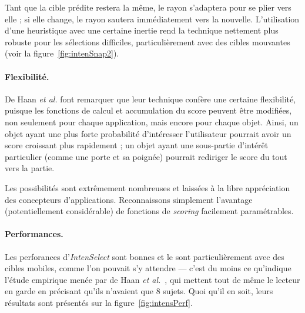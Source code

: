 	Tant que la cible prédite restera la même, le rayon s'adaptera pour se plier vers elle ; si elle change, le rayon sautera immédiatement vers la nouvelle. L'utilisation d'une heuristique avec une certaine \og inertie \fg{} rend la technique nettement plus robuste pour les sélections difficiles, particulièrement avec des cibles mouvantes (voir la figure~\ref{fig:intenSnap2}).
	
	\paragraph{Flexibilité.}
	De Haan \emph{et al.} font remarquer que leur technique confère une certaine flexibilité, puisque les fonctions de calcul et accumulation du score peuvent être modifiées, non seulement pour chaque application, mais encore pour chaque objet. Ainsi, un objet ayant une plus forte probabilité d'intéresser l'utilisateur pourrait avoir un score croissant plus rapidement ; un objet ayant une sous-partie d'intérêt particulier (comme une porte et sa poignée) pourrait rediriger le score du tout vers la partie.
	
	Les possibilités sont extrêmement nombreuses et laissées à la libre appréciation des concepteurs d'applications. Reconnaissons simplement l'avantage (potentiellement considérable) de fonctions de \emph{scoring} facilement paramétrables.
	
	\paragraph{Performances.}
	Les perforances d'\emph{IntenSelect} sont bonnes et le sont particulièrement avec des cibles mobiles, comme l'on pouvait s'y attendre --- c'est du moins ce qu'indique l'étude empirique menée par de Haan \emph{et al.}~\cite{de2005intenselect}, qui mettent tout de même le lecteur en garde en précisant qu'ils n'avaient que 8 sujets. Quoi qu'il en soit, leurs résultats sont présentés sur la figure~\ref{fig:intensPerf}.
	
